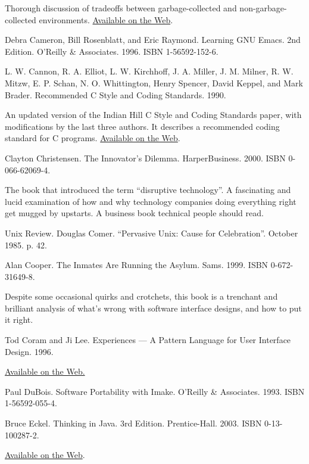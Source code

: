 \documentclass[12pt,oneside]{book}
\begin{document}
\begin{thebibliography}{9}
Thorough discussion of tradeoffs between garbage-collected and non-garbage-collected environments. \href{http://www.hpl.hp.com/personal/Hans_Boehm/gc/issues.html}{Available on the Web}.

 Debra Cameron, Bill Rosenblatt, and Eric Raymond. Learning GNU Emacs. 2nd Edition. O'Reilly \&{} Associates. 1996. ISBN 1-56592-152-6.

 L. W. Cannon, R. A. Elliot, L. W. Kirchhoff, J. A. Miller, J. M. Milner, R. W. Mitzw, E. P. Schan, N. O. Whittington, Henry Spencer, David Keppel, and Mark Brader. Recommended C Style and Coding Standards. 1990.

An updated version of the Indian Hill C Style and Coding Standards paper, with modifications by the last three authors. It describes a recommended coding standard for C programs. \href{http://www.apocalypse.org/pub/u/paul/docs/cstyle/cstyle.htm}{Available on the Web}.

 Clayton Christensen. The Innovator's Dilemma. HarperBusiness. 2000. ISBN 0-066-62069-4.

The book that introduced the term “disruptive technology”. A fascinating and lucid examination of how and why technology companies doing everything right get mugged by upstarts. A business book technical people should read.

 Unix Review. Douglas Comer. “Pervasive Unix: Cause for Celebration”. October 1985. p. 42.

 Alan Cooper. The Inmates Are Running the Asylum. Sams. 1999. ISBN 0-672-31649-8.

Despite some occasional quirks and crotchets, this book is a trenchant and brilliant analysis of what's wrong with software interface designs, and how to put it right.

 Tod Coram and Ji Lee. Experiences — A Pattern Language for User Interface Design. 1996.

\href{http://www.maplefish.com/todd/papers/Experiences.html}{Available on the Web.}

 Paul DuBois. Software Portability with Imake. O'Reilly \&{} Associates. 1993. ISBN 1-56592-055-4.

 Bruce Eckel. Thinking in Java. 3rd Edition. Prentice-Hall. 2003. ISBN 0-13-100287-2.

\href{http://www.mindview.net/Books/TIJ/}{Available on the Web}.


\end{thebibliography}
\end{document}
